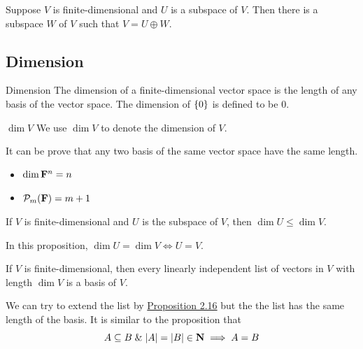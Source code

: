 \documentclass[12pt,a4paper]{article}
\begin{document}
    \begin{prop}\label{2.18}
        Suppose $V$ is finite-dimensional and $U$ is a subspace of $V$. Then there is a subspace $W$ of $V$ such that $V=U\oplus W$.
    \end{prop}
    \hfill

    \subsection{Dimension}
    \begin{defi}{Dimension}\label{2.19}%
        The dimension of a finite-dimensional vector space is the length of any basis of the vector space. The dimension of $\left\{0\right\}$ is defined to be $0$.
    \end{defi}
    \begin{notation}{$\dim{V}$}
        We use $\dim{V}$ to denote the dimension of $V$. 
    \end{notation}
    \begin{remark}
        It can be prove that any two basis of the same vector space have the same length.
    \end{remark}
    \hfill
    
    \begin{eg}\label{2.20}
        \hfill
        \begin{itemize}
            \item $\dim{\mathbf{F}^n}=n$
            \item $\mathcal{P}_m(\mathbf{F})=m+1$
        \end{itemize}
    \end{eg}
    \hfill

    \begin{prop}\label{2.21}
        If $V$ is finite-dimensional and $U$ is the subspace of $V$, then $\dim U\leq\dim V$.
    \end{prop}
    \begin{remark}
        In this proposition, $\dim{U}=\dim{V}\iff U=V$.
    \end{remark}
    \hfill

    \begin{prop}\label{2.22}
        If $V$ is finite-dimensional, then every linearly independent list of vectors in $V$ with length $\dim V$ is a basis of $V$.
    \end{prop}
    \begin{remark}
        We can try to extend the list by \hyperref[2.16]{Proposition 2.16} but the the list has the same length of the basis. It is similar to the proposition that
        $$
        A\subseteq B \;\&\; |A|=|B|\in\mathbf{N} \implies A=B
        $$
    \end{remark}
    \hfill
\end{document}

